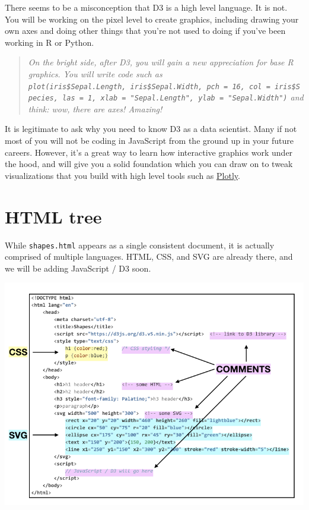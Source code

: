 \documentclass[
  openany]{book}
\begin{document}
There seems to be a misconception that D3 is a high level language. It is not. You will be working on the pixel level to create graphics, including drawing your own axes and doing other things that you're not used to doing if you've been working in R or Python.

\begin{quote}
\emph{On the bright side, after D3, you will gain a new appreciation for base R graphics. You will write code such as \texttt{plot(iris\$Sepal.Length,\ iris\$Sepal.Width,\ pch\ =\ 16,\ col\ =\ iris\$Species,\ las\ =\ 1,\ xlab\ =\ "Sepal.Length",\ ylab\ =\ "Sepal.Width")} and think: wow, there are axes! Amazing!}
\end{quote}

It is legitimate to ask why you need to know D3 as a data scientist. Many if not most of you will not be coding in JavaScript from the ground up in your future careers. However, it's a great way to learn how interactive graphics work under the hood, and will give you a solid foundation which you can draw on to tweak visualizations that you build with high level tools such as \href{https://plot.ly/}{Plotly}.

\hypertarget{html-tree}{%
\section{\texorpdfstring{HTML tree }{HTML tree }}\label{html-tree}}

While \texttt{shapes.html} appears as a single consistent document, it is actually comprised of multiple languages. HTML, CSS, and SVG are already there, and we will be adding JavaScript / D3 soon.

\begin{center}\includegraphics[width=1\linewidth]{images/shapes} \end{center}
\end{document}
